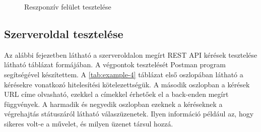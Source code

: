 \begin{enumerate}
	\begin{figure}[H]
		\centering
		\hspace{5pt}
		\caption{Reszponzív felület tesztelése}
		\label{fig.picture-16}
	\end{figure}
\end{enumerate}


\subsection{Szerveroldal tesztelése}
Az alábbi fejezetben látható a szerveroldalon megírt REST API kérések tesztelése látható táblázat formájában. A végpontok tesztelését Postman\cite{postman} program segítségével készítettem. A \ref{tab:example-4} táblázat első oszlopában látható a kérésekre vonatkozó hitelesítési kötelezettségük. A második oszlopban a kérések URL címe olvasható, ezekkel a címekkel érhetőek el a back-enden megírt függvények. A harmadik és negyedik oszlopban ezeknek a kéréseknek a végrehajtás státuszáról látható válaszüzenetek. Ilyen információ például az, hogy sikeres volt-e a művelet, és milyen üzenet társul hozzá.

